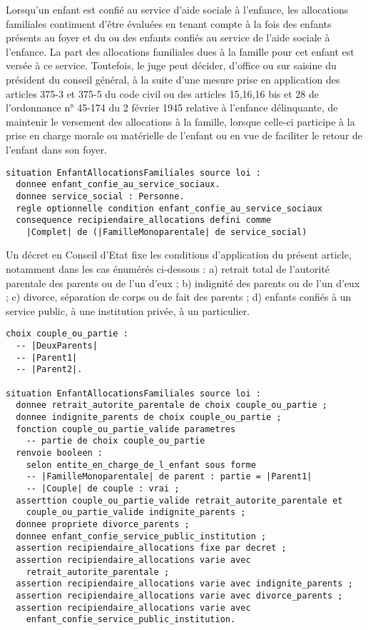 \documentclass[11pt, french]{article}
\begin{document}
Lorsqu'un enfant est confié au service d'aide sociale à l'enfance, les allocations familiales continuent d'être évaluées en tenant compte à la fois des enfants présents au foyer et du ou des enfants confiés au service de l'aide sociale à l'enfance. La part des allocations familiales dues à la famille pour cet enfant est versée à ce service. Toutefois, le juge peut décider, d'office ou sur saisine du président du conseil général, à la suite d'une mesure prise en application des articles 375-3 et 375-5 du code civil ou des articles 15,16,16 bis et 28 de l'ordonnance n° 45-174 du 2 février 1945 relative à l'enfance délinquante, de maintenir le versement des allocations à la famille, lorsque celle-ci participe à la prise en charge morale ou matérielle de l'enfant ou en vue de faciliter le retour de l'enfant dans son foyer.
\begin{lstlisting}
situation EnfantAllocationsFamiliales source loi :
  donnee enfant_confie_au_service_sociaux.
  donnee service_social : Personne.
  regle optionnelle condition enfant_confie_au_service_sociaux
  consequence recipiendaire_allocations defini comme
    |Complet| de (|FamilleMonoparentale| de service_social)
\end{lstlisting}

Un décret en Conseil d'Etat fixe les conditions d'application du présent article, notamment dans les cas énumérés ci-dessous :
a) retrait total de l'autorité parentale des parents ou de l'un d'eux ;
b) indignité des parents ou de l'un d'eux ;
c) divorce, séparation de corps ou de fait des parents ;
d) enfants confiés à un service public, à une institution privée, à un particulier.
\begin{lstlisting}
choix couple_ou_partie :
  -- |DeuxParents|
  -- |Parent1|
  -- |Parent2|.

situation EnfantAllocationsFamiliales source loi :
  donnee retrait_autorite_parentale de choix couple_ou_partie ;
  donnee indignite_parents de choix couple_ou_partie ;
  fonction couple_ou_partie_valide parametres
    -- partie de choix couple_ou_partie
  renvoie booleen :
    selon entite_en_charge_de_l_enfant sous forme
    -- |FamilleMonoparentale| de parent : partie = |Parent1|
    -- |Couple| de couple : vrai ;
  asserttion couple_ou_partie_valide retrait_autorite_parentale et
    couple_ou_partie_valide indignite_parents ;
  donnee propriete divorce_parents ;
  donnee enfant_confie_service_public_institution ;
  assertion recipiendaire_allocations fixe par decret ;
  assertion recipiendaire_allocations varie avec
    retrait_autorite_parentale ;
  assertion recipiendaire_allocations varie avec indignite_parents ;
  assertion recipiendaire_allocations varie avec divorce_parents ;
  assertion recipiendaire_allocations varie avec
    enfant_confie_service_public_institution.
\end{lstlisting}
\end{document}
